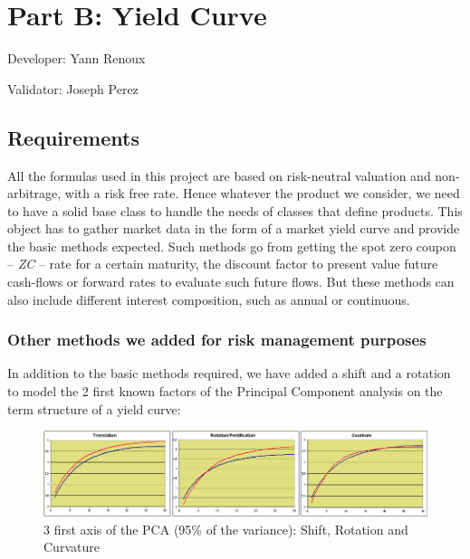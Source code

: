 \chapter{Part B: Yield Curve}
Developer: Yann Renoux

\noindent Validator: Joseph Perez



\section{Requirements}


\par All the formulas used in this project are based on risk-neutral valuation
and non-arbitrage, with a risk free rate. Hence whatever the product we consider,
we need to have a solid base class to handle the needs of classes that define products.
This object has to gather market data in the form of a market yield curve and provide the basic methods expected.
Such methods go from getting the spot zero coupon -- \emph{ZC} -- rate for a certain
maturity, the discount factor to present value future cash-flows or forward rates to evaluate
such future flows. But these methods can also include different interest composition, such as annual or continuous.

\subsection{Other methods we added for risk management purposes}

\par In addition to the basic methods required, we have added a shift and a rotation to model the 2 first
known factors of the Principal Component analysis on the term structure of a yield curve:

\begin{figure}
\begin{center}
        \includegraphics[width=12cm]{3mvts.png}
        \caption{3 first axis of the PCA (95\% of the variance): Shift, Rotation and Curvature}
\end{center}
\end{figure}



